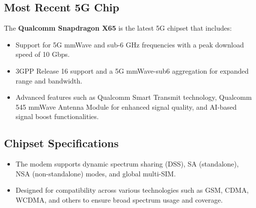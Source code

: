\subsection*{Most Recent 5G Chip}
The \textbf{Qualcomm\textsuperscript{\textregistered} Snapdragon X65} is the latest 5G chipset that includes:
\begin{itemize}
    \item Support for 5G mmWave and sub-6 GHz frequencies with a peak download speed of 10 Gbps.
    \item 3GPP Release 16 support and a 5G mmWave-sub6 aggregation for expanded range and bandwidth.
    \item Advanced features such as Qualcomm\textsuperscript{\textregistered} Smart Transmit technology, Qualcomm\textsuperscript{\textregistered} 545 mmWave Antenna Module for enhanced signal quality, and AI-based signal boost functionalities.
\end{itemize}

\subsection*{Chipset Specifications}
\begin{itemize}
    \item The modem supports dynamic spectrum sharing (DSS), SA (standalone), NSA (non-standalone) modes, and global multi-SIM.
    \item Designed for compatibility across various technologies such as GSM, CDMA, WCDMA, and others to ensure broad spectrum usage and coverage.
\end{itemize}

